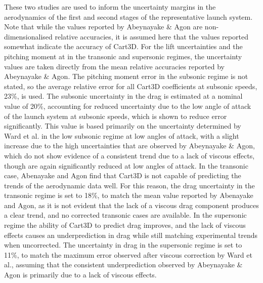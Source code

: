 These two studies are used to inform the uncertainty margins in the aerodynamics of the first and second stages of the representative launch system. Note that while the values reported by Abeynayake \& Agon\cite{Abeynayake2013a} are non-dimensionalised relative accuracies, it is assumed here that the values reported somewhat indicate the accuracy of Cart3D. 
For the lift uncertainties and the pitching moment at in the transonic and supersonic regimes, the uncertainty values are taken directly from the mean relative accuracies reported by Abeynayake \& Agon\cite{Abeynayake2013a}. The pitching moment error in the subsonic regime is not stated, so the average relative error for all Cart3D coefficients at subsonic speeds, 23\%, is used.
The subsonic uncertainty in the drag is estimated at a nominal value of 20\%, accounting for reduced uncertainty due to the low angle of attack of the launch system at subsonic speeds, which is shown to reduce error significantly.
This value is based primarily on the uncertainty determined by Ward et al.\cite{Ward2018} in the low subsonic regime at low angles of attack, with a slight increase due to the high uncertainties that are observed by Abeynayake \& Agon\cite{Abeynayake2013a}, which do not show evidence of a consistent trend due to a lack of viscous effects, though are again significantly reduced at low angles of attack. 
In the transonic case, Abenayake and Agon find that Cart3D is not capable of predicting the trends of the aerodynamic data well\cite{Abeynayake2013a}.
For this reason, the drag uncertainty in the transonic regime is set to 18\%, to match the mean value reported by Abenayake and Agon\cite{Abeynayake2013a}, as it is not evident that the lack of a viscous drag component produces a clear trend, and no corrected transonic cases are available. In the supersonic regime the ability of Cart3D to predict drag improves, and the lack of viscous effects causes an underprediction in drag while still matching experimental trends when uncorrected\cite{Abeynayake2013a,Ward2018}. The uncertainty in drag in the supersonic regime is set to 11\%, to match the maximum error observed after viscous correction by Ward et al.\cite{Ward2018}, assuming that the consistent underprediction observed by Abeynayake \& Agon\cite{Abeynayake2013a} is primarily due to a lack of viscous effects.








